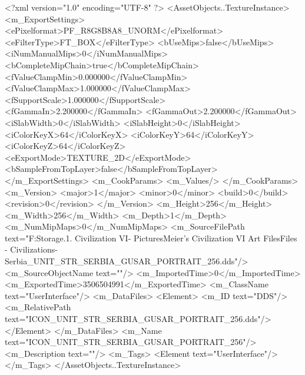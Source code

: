 <?xml version="1.0" encoding="UTF-8" ?>
<AssetObjects..TextureInstance>
	<m_ExportSettings>
		<ePixelformat>PF_R8G8B8A8_UNORM</ePixelformat>
		<eFilterType>FT_BOX</eFilterType>
		<bUseMips>false</bUseMips>
		<iNumManualMips>0</iNumManualMips>
		<bCompleteMipChain>true</bCompleteMipChain>
		<fValueClampMin>0.000000</fValueClampMin>
		<fValueClampMax>1.000000</fValueClampMax>
		<fSupportScale>1.000000</fSupportScale>
		<fGammaIn>2.200000</fGammaIn>
		<fGammaOut>2.200000</fGammaOut>
		<iSlabWidth>0</iSlabWidth>
		<iSlabHeight>0</iSlabHeight>
		<iColorKeyX>64</iColorKeyX>
		<iColorKeyY>64</iColorKeyY>
		<iColorKeyZ>64</iColorKeyZ>
		<eExportMode>TEXTURE_2D</eExportMode>
		<bSampleFromTopLayer>false</bSampleFromTopLayer>
	</m_ExportSettings>
	<m_CookParams>
		<m_Values/>
	</m_CookParams>
	<m_Version>
		<major>1</major>
		<minor>0</minor>
		<build>0</build>
		<revision>0</revision>
	</m_Version>
	<m_Height>256</m_Height>
	<m_Width>256</m_Width>
	<m_Depth>1</m_Depth>
	<m_NumMipMaps>0</m_NumMipMaps>
	<m_SourceFilePath text="F:\Mod Storage\2.1. Civilization VI\Mods\Archive - Pictures\Sid Meier's Civilization VI Art Files\Art Files - Civilizations\Civilization - Serbia\ICON_UNIT_STR_SERBIA_GUSAR_PORTRAIT_256.dds"/>
	<m_SourceObjectName text=""/>
	<m_ImportedTime>0</m_ImportedTime>
	<m_ExportedTime>3506504991</m_ExportedTime>
	<m_ClassName text="UserInterface"/>
	<m_DataFiles>
		<Element>
			<m_ID text="DDS"/>
			<m_RelativePath text="ICON_UNIT_STR_SERBIA_GUSAR_PORTRAIT_256.dds"/>
		</Element>
	</m_DataFiles>
	<m_Name text="ICON_UNIT_STR_SERBIA_GUSAR_PORTRAIT_256"/>
	<m_Description text=""/>
	<m_Tags>
		<Element text="UserInterface"/>
	</m_Tags>
</AssetObjects..TextureInstance>

